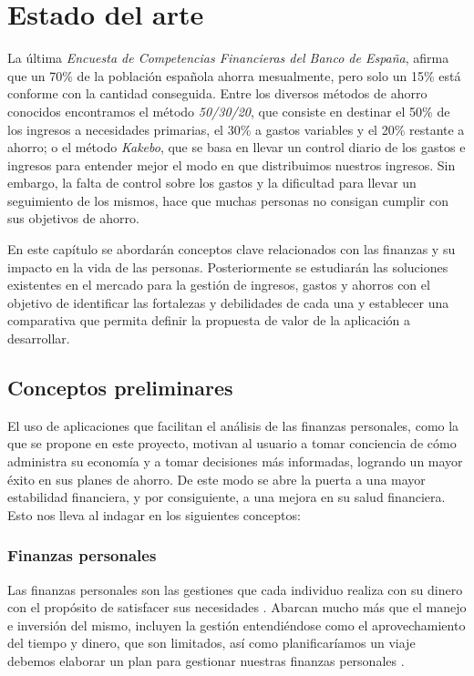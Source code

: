 \chapter{Estado del arte}\label{chap:estado_del_arte}
La última \textit{Encuesta de Competencias Financieras del Banco de España}, afirma que un 70\% de la población española ahorra mesualmente, pero solo un 15\% está conforme con la cantidad conseguida\cite{encuesta-competencias}. Entre los diversos métodos de ahorro conocidos encontramos el método \textit{50/30/20}, que consiste en destinar el 50\% de los ingresos a necesidades primarias, el 30\% a gastos variables y el 20\% restante a ahorro; o el método \textit{Kakebo}, que se basa en llevar un control diario de los gastos e ingresos para entender mejor el modo en que distribuimos nuestros ingresos\cite{metodos-ahorro}. Sin embargo, la falta de control sobre los gastos y la dificultad para llevar un seguimiento de los mismos, hace que muchas personas no consigan cumplir con sus objetivos de ahorro.

En este capítulo se abordarán conceptos clave relacionados con las finanzas y su impacto en la vida de las personas. Posteriormente se estudiarán las soluciones existentes en el mercado para la gestión de ingresos, gastos y ahorros con el objetivo de identificar las fortalezas y debilidades de cada una y establecer una comparativa que permita definir la propuesta de valor de la aplicación a desarrollar.

\section{Conceptos preliminares}
El uso de aplicaciones que facilitan el análisis de las finanzas personales, como la que se propone en este proyecto, motivan al usuario a tomar conciencia de cómo administra su economía y a tomar decisiones más informadas, logrando un mayor éxito en sus planes de ahorro. De este modo se abre la puerta a una mayor estabilidad financiera, y por consiguiente, a una mejora en su salud financiera. Esto nos lleva al indagar en los siguientes conceptos:

\subsection*{Finanzas personales}
Las finanzas personales son las gestiones que cada individuo realiza con su dinero 
con el propósito de satisfacer sus necesidades \cite{tesis-bienestar-financiero}.
Abarcan mucho más que el manejo e inversión del mismo, incluyen la gestión  
entendiéndose como el aprovechamiento del tiempo y dinero, que son limitados, así 
como planificaríamos un viaje debemos elaborar un plan para gestionar nuestras 
finanzas personales \cite{tyson2023personal}. 

